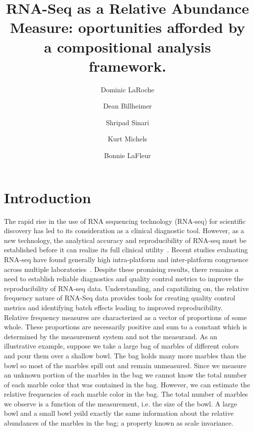 \documentclass{article}\usepackage[]{graphicx}\usepackage[]{color}
\title{RNA-Seq as a Relative Abundance Measure: oportunities afforded by a compositional analysis framework.}
\author{Dominic LaRoche \and Dean Billheimer \and Shripad Sinari \and Kurt Michels \and  Bonnie LaFleur}
\theoremstyle{definition}
\begin{document}
\maketitle

\doublespacing


\section{Introduction}

The rapid rise in the use of RNA sequencing technology (RNA-seq) for scientific discovery has led to its consideration as a clinical diagnostic tool. However, as a new technology, the analytical accuracy and reproducibility of RNA-seq must be established before it can realize its full clinical utility~\cite{SEQC/MAQC-IIIConsortium2014,VanKeuren-Jensen2014}. Recent studies evaluating RNA-seq have found generally high intra-platform and inter-platform congruence across multiple laboratories~\cite{Li2013, tHoen2013, SEQC/MAQC-IIIConsortium2014}. Despite these promising results, there remains a need to establish reliable diagnostics and quality control metrics to improve the reproducibility of RNA-seq data.  Understanding, and capatilizing on, the relative frequency nature of RNA-Seq data provides tools for  creating quality control metrics and identifying batch effects leading to improved reproducibility.\\


Relative frequency measures are characterized as a vector of proportions of some whole.  These proportions are necessarily positive and sum to a constant which is determined by the measurement system and not the measurand.  As an illustrative example, suppose we take a large bag of marbles of different colors and pour them over a shallow bowl.  The bag holds many more marbles than the bowl so most of the marbles spill out and remain unmeasured.  Since we measure an unknown portion of the marbles in the bag we cannot know the total number of each marble color that was contained in the bag.  However, we can estimate the relative frequencies of each marble color in the bag.  The total number of marbles we observe is a function of the measurement, i.e. the size of the bowl.  A large bowl and a small bowl yeild exactly the same information about the relative abundances of the marbles in the bag; a property known as scale invariance. \\
\end{document}
